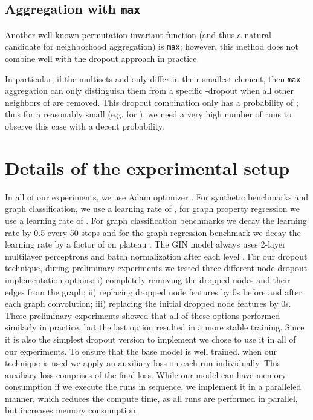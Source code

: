 \documentclass{article}
\begin{document}
\subsection{Aggregation with \texttt{max}}

Another well-known permutation-invariant function (and thus a natural candidate for neighborhood aggregation) is \texttt{max}; however, this method does not combine well with the dropout approach in practice.

In particular, if the multisets  and  only differ in their smallest element, then \texttt{max} aggregation can only distinguish them from a specific -dropout when all other neighbors of  are removed. This dropout combination only has a probability of ; thus for a reasonably small  (e.g. for ), we need a very high number of runs to observe this case with a decent probability.

\section{Details of the experimental setup}


In all of our experiments, we use Adam optimizer \citep{kingma2015adam}. For synthetic benchmarks and graph classification, we use a learning rate of , for graph property regression we use a learning rate of . For graph classification benchmarks we decay the learning rate by 0.5 every 50 steps \citep{GIN} and for the graph regression benchmark we decay the learning rate by a factor of  on plateau \citep{morris2019weisfeiler}. The GIN model always uses 2-layer multilayer perceptrons and batch normalization \citep{ioffe2015batch} after each level \citep{GIN}. For our dropout technique, during preliminary experiments we tested three different node dropout implementation options: i) completely removing the dropped nodes and their edges from the graph; ii) replacing dropped node features by 0s before and after each graph convolution; iii) replacing the initial dropped node features by 0s. These preliminary experiments showed that all of these options performed similarly in practice, but the last option resulted in a more stable training. Since it is also the simplest dropout version to implement we chose to use it in all of our experiments. To ensure that the base model is well trained, when our technique is used we apply an auxiliary loss on each run individually. This auxiliary loss comprises  of the final loss. While our model can have  memory consumption if we execute the runs in sequence, we implement it in a paralleled manner, which reduces the compute time, as all  runs are performed in parallel, but increases memory consumption.
\end{document}
